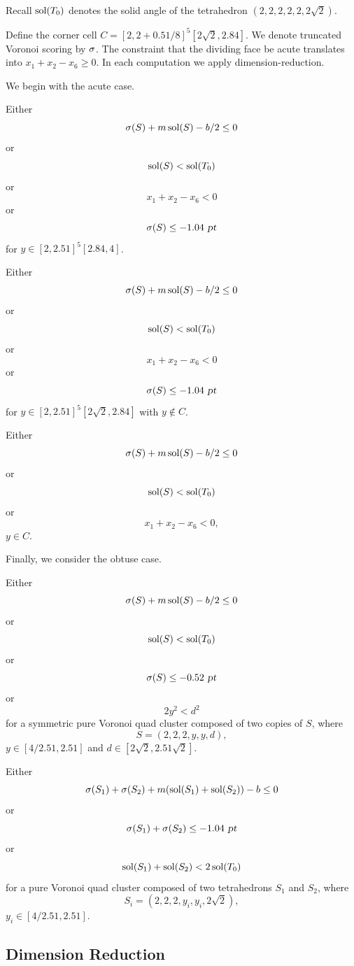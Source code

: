 Recall $\operatorname{sol}(T_0)$ denotes the solid angle of the tetrahedron
$(2,2,2,2,2,2\sqrt{2})$.

Define the corner cell $C = [2, 2 + 0.51/8]^5[2\sqrt{2}, 2.84]$.
We denote truncated Voronoi scoring by $\operatorname{\sigma}$.
The constraint that the dividing face be acute translates
into $x_1 + x_2 - x_6 \ge 0$.  In each computation we apply
dimension-reduction.

We begin with the acute case.

\begin{calcf}
Either
\[\operatorname{\sigma}(S) + m \operatorname{sol}(S) - b/2 \le 0\]
or
\[\operatorname{sol}(S) < \operatorname{sol}(T_0)\]
or
\[x_1 + x_2 - x_6 < 0\]
or
\[\operatorname{\sigma}(S) \le -1.04 \text{ \sl pt}\] for
$y \in [2,2.51]^5[2.84,4]$.
\label{acute:cut}
\end{calcf}

\begin{calcf}
Either
\[\operatorname{\sigma}(S) + m \operatorname{sol}(S) - b/2 \le 0\]
or
\[\operatorname{sol}(S) < \operatorname{sol}(T_0)\]
or
\[x_1 + x_2 - x_6 < 0\]
or
\[\operatorname{\sigma}(S) \le -1.04 \text{ \sl pt}\]
for
$y \in [2,2.51]^5[2\sqrt{2},2.84]$ with $y \notin C$.
\label{acute:vor}
\end{calcf}

\begin{calcf}
Either
\[\operatorname{\sigma}(S) + m \operatorname{sol}(S) - b/2 \le 0\]
or
\[\operatorname{sol}(S) < \operatorname{sol}(T_0)\]
or
\[x_1 + x_2 - x_6 < 0,\]
$y \in C$.
\label{acute:corner}
\end{calcf}

Finally, we consider the obtuse case.

\begin{calcf}
Either
\[\operatorname{\sigma}(S) + m \operatorname{sol}(S) - b/2 \le 0\]
or
\[\operatorname{sol}(S) < \operatorname{sol}(T_0)\]
or
\[\operatorname{\sigma}(S) \le -0.52 \text{ \sl pt}\]
or
\[ 2 y^2 < d^2 \]
for a symmetric pure Voronoi quad cluster composed of two copies of $S$,
where \[S = (2,2,2,y,y,d),\]
$y \in [4/2.51,2.51]$ and $d \in [2\sqrt{2}, 2.51 \sqrt{2}]$.
\label{obtuse:vor}
\end{calcf}

\begin{calcf}
Either
\[\operatorname{\sigma}(S_1) + \operatorname{\sigma}(S_2) + m (\operatorname{sol}(S_1) + \operatorname{sol}(S_2)) - b \le 0\]
or
\[\operatorname{\sigma}(S_1) + \operatorname{\sigma}(S_2) \le -1.04 \text{ \sl pt}\]
or
\[\operatorname{sol}(S_1) + \operatorname{sol}(S_2) < 2\operatorname{sol}(T_0)\]
for a pure Voronoi quad cluster composed of two tetrahedrons $S_1$ and $S_2$,
where \[S_i = (2,2,2,y_i,y_i,2\sqrt{2}),\]
$y_i \in [4/2.51,2.51]$.
\label{obtuse:vor2}
\end{calcf}


\subsection{Dimension Reduction}

